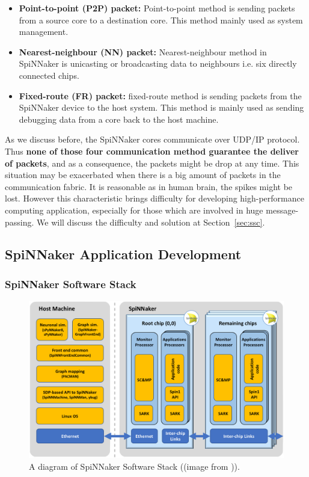 \begin{itemize}
    \item \textbf{Point-to-point (P2P) packet:} Point-to-point method is sending packets from a source core to a destination core. This method mainly used as system management.
    
    \item \textbf{Nearest-neighbour (NN) packet:} Nearest-neighbour method in SpiNNaker is unicasting or broadcasting data to neighbours i.e. six directly connected chips.
    
    \item \textbf{Fixed-route (FR) packet:} fixed-route method is sending packets from the SpiNNaker device to the host system. This method is mainly used as sending debugging data from a core back to the host machine.
\end{itemize}

As we discuss before, the SpiNNaker cores communicate over UDP/IP protocol. Thus \textbf{none of those four communication method guarantee the deliver of packets}, and as a consequence, the packets might be drop at any time. This situation may be exacerbated when there is a big amount of packets in the communication fabric. It is reasonable as in human brain, the spikes might be lost. However this characteristic brings difficulty for developing high-performance computing application, especially for those which are involved in huge message-passing. We will discuss the difficulty and solution at Section~\ref{sec:ssc}.

\subsection{SpiNNaker Application Development} \label{sec:sss}
\subsubsection{SpiNNaker Software Stack}
    \begin{figure}[!tb]
        \centering
       \includegraphics[width=1\textwidth]{figures/software_stack.png}
       \caption{A diagram of SpiNNaker Software Stack ((image from \cite{spin-chip-resources})).}
       \label{fig:software_stack}
    \end{figure}

